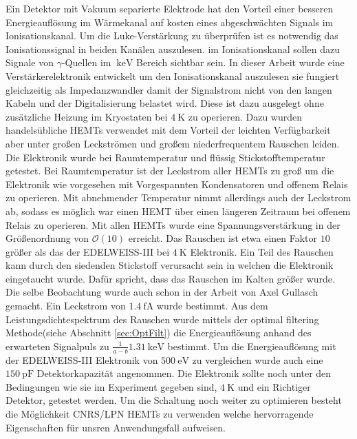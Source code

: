 Ein Detektor mit Vakuum separierte Elektrode hat den Vorteil einer besseren Energieauflösung im Wärmekanal auf kosten eines abgeschwächten Signals im Ionisationskanal.
Um die Luke-Verstärkung zu überprüfen ist es notwendig das Ionisationssignal in beiden Kanälen auszulesen.
im Ionisationskanal sollen dazu Signale von $\gamma$-Quellen im $\SI{}{\kilo\electronvolt}$ Bereich sichtbar sein.
In dieser Arbeit wurde eine Verstärkerelektronik entwickelt um den Ionisationskanal auszulesen sie fungiert gleichzeitig als Impedanzwandler damit der Signalstrom nicht von den langen Kabeln und der Digitalisierung belastet wird.
Diese ist dazu ausgelegt ohne zusätzliche Heizung im Kryostaten bei $\SI{4}{\kelvin}$ zu operieren.
Dazu wurden handelsübliche HEMTs verwendet mit dem Vorteil der leichten Verfügbarkeit aber unter großen Leckströmen und großem niederfrequentem Rauschen leiden.
Die Elektronik wurde bei Raumtemperatur und flüssig Stickstofftemperatur getestet.
Bei Raumtemperatur ist der Leckstrom aller HEMTs zu groß um die Elektronik wie vorgesehen mit Vorgespannten Kondensatoren und offenem Relais zu operieren.
Mit abnehmender Temperatur nimmt allerdings auch der Leckstrom ab, sodass es möglich war einen HEMT über einen längeren Zeitraum bei offenem Relais zu operieren.
Mit allen HEMTs wurde eine Spannungsverstärkung in der Größenordnung von $\mathcal{O}(10)$ erreicht.
Das Rauschen ist etwa einen Faktor $10$ größer als das der EDELWEISS-III bei $\SI{4}{\kelvin}$ Elektronik\cite{EDWIII}.
Ein Teil des Rauschen kann durch den siedenden Stickstoff verursacht sein in welchen die Elektronik eingetaucht wurde.
Dafür spricht, dass das Rauschen im Kalten größer wurde.
Die selbe Beobachtung wurde auch schon in der Arbeit von Axel Gullasch\cite{Gullasch2015} gemacht.
Ein Leckstrom von $\SI{1,4}{\femto\ampere}$ wurde bestimmt.
Aus dem Leistungsdichtespektrum des Rauschen wurde mittels der optimal filtering Methode(siehe Abschnitt \ref{sec:OptFilt}) die Energieauflösung anhand des erwarteten Signalpuls zu $\frac{1}{a-b}\SI{1,31}{\kilo\electronvolt}$ bestimmt.
Um die Energieauflösung mit der EDELWEISS-III Elektronik von $\SI{500}{\electronvolt}$ zu vergleichen wurde auch eine $\SI{150}{\pico\farad}$ Detektorkapazität angenommen.
Die Elektronik sollte noch unter den Bedingungen wie sie im Experiment gegeben sind, $\SI{4}{\kelvin}$ und ein Richtiger Detektor, getestet werden.
Um die Schaltung noch weiter zu optimieren besteht die Möglichkeit CNRS/LPN HEMTs zu verwenden welche hervorragende Eigenschaften für unsren Anwendungsfall aufweisen. 